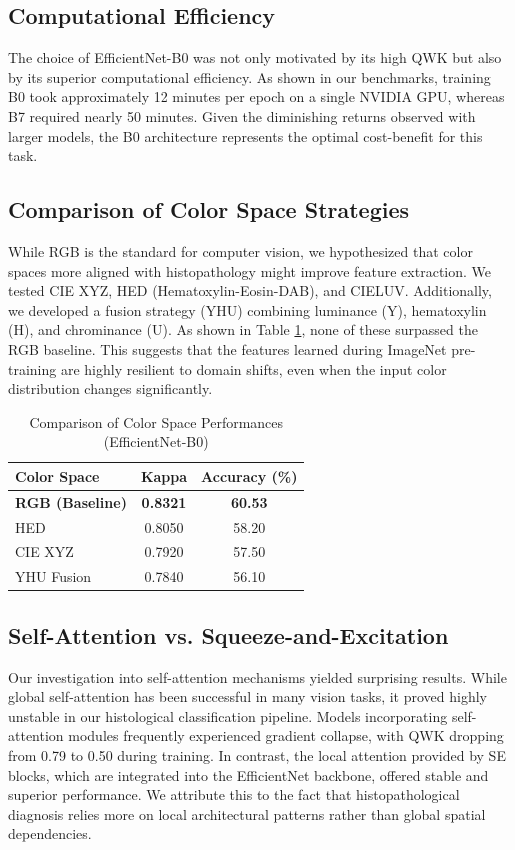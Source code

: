 \documentclass[10pt,conference]{IEEEtran}
\begin{document}
\subsection{Computational Efficiency}
The choice of EfficientNet-B0 was not only motivated by its high QWK but also by its superior computational efficiency. As shown in our benchmarks, training B0 took approximately 12 minutes per epoch on a single NVIDIA GPU, whereas B7 required nearly 50 minutes. Given the diminishing returns observed with larger models, the B0 architecture represents the optimal cost-benefit for this task.

\subsection{Comparison of Color Space Strategies}
While RGB is the standard for computer vision, we hypothesized that color spaces more aligned with histopathology might improve feature extraction. We tested CIE XYZ, HED (Hematoxylin-Eosin-DAB), and CIELUV. Additionally, we developed a fusion strategy (YHU) combining luminance (Y), hematoxylin (H), and chrominance (U). As shown in Table \ref{table_color}, none of these surpassed the RGB baseline. This suggests that the features learned during ImageNet pre-training are highly resilient to domain shifts, even when the input color distribution changes significantly.

\begin{table}[!h]
\renewcommand{\arraystretch}{1.3}
\caption{Comparison of Color Space Performances (EfficientNet-B0)}
\label{table_color}
\centering
\begin{tabular}{lcc}
\hline
\textbf{Color Space} & \textbf{Kappa} & \textbf{Accuracy (\%)} \\
\hline
\textbf{RGB (Baseline)} & \textbf{0.8321} & \textbf{60.53} \\
HED & 0.8050 & 58.20 \\
CIE XYZ & 0.7920 & 57.50 \\
YHU Fusion & 0.7840 & 56.10 \\
\hline
\end{tabular}
\end{table}

\subsection{Self-Attention vs. Squeeze-and-Excitation}
Our investigation into self-attention mechanisms yielded surprising results. While global self-attention has been successful in many vision tasks, it proved highly unstable in our histological classification pipeline. Models incorporating self-attention modules frequently experienced gradient collapse, with QWK dropping from 0.79 to 0.50 during training. In contrast, the local attention provided by SE blocks, which are integrated into the EfficientNet backbone, offered stable and superior performance. We attribute this to the fact that histopathological diagnosis relies more on local architectural patterns rather than global spatial dependencies.
\end{document}
